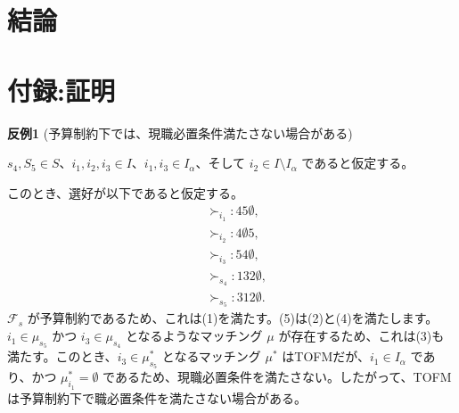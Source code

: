 \documentclass[12pt, a4paper]{article}
\theoremstyle{definition}
\theoremstyle{remark}
\theoremstyle{plain}
\begin{document}
\section{結論}


\section*{付録:証明}

  

\textbf{反例1} (予算制約下では、現職必置条件満たさない場合がある)

$s_4, S_5 \in S$、$i_1, i_2, i_3 \in I$、$i_1, i_3 \in I_\alpha$、そして $i_2 \in I \setminus I_\alpha$ であると仮定する。

このとき、選好が以下であると仮定する。
\begin{align*}
    &\succ_{i_1}: 45\emptyset, \\
    &\succ_{i_2}: 4\emptyset 5, \\
    &\succ_{i_3}: 54\emptyset, \\
    &\succ_{s_4}: 132\emptyset, \\
    &\succ_{s_5}: 312\emptyset. \tag{5}
\end{align*}
$\mathcal{F}_s$ が予算制約であるため、これは(1)を満たす。(5)は(2)と(4)を満たします。$i_1 \in \mu_{s_5}$ かつ $i_3 \in \mu_{s_4}$ となるようなマッチング $\mu$ が存在するため、これは(3)も満たす。このとき、$i_3 \in \mu^*_{s_5}$ となるマッチング $\mu^*$ はTOFMだが、$i_1 \in I_\alpha$ であり、かつ $\mu^*_{i_1} = \emptyset$ であるため、現職必置条件を満たさない。したがって、TOFMは予算制約下で職必置条件を満たさない場合がある。
\end{document}
